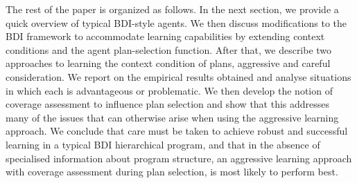 The rest of the paper is organized as follows. In the next section, we
provide a quick overview of typical BDI-style agents.
%
We then discuss modifications to the BDI framework to accommodate learning capabilities by
extending context conditions and the agent plan-selection function. 
%
After that, we describe two approaches to learning the context
condition of plans, aggressive and careful consideration.
%
We report on the empirical results obtained and analyse situations in
which each is advantageous or problematic.
%
We then develop the notion of coverage assessment to influence plan
selection and show that this addresses many of the issues that can
otherwise arise when using the aggressive learning approach.
%
We conclude that care must be taken to
achieve robust and successful learning in a typical BDI hierarchical
program, and that in the absence of specialised information about
program structure, an aggressive learning approach with coverage
assessment during plan selection, is most likely to perform best.
%







